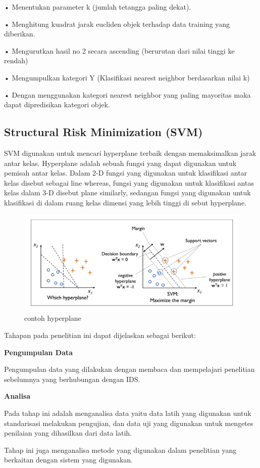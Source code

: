 \documentclass[conference]{IEEEtran}
\begin{document}
• Menentukan parameter k (jumlah tetangga paling dekat).

• Menghitung kuadrat jarak eucliden objek terhadap data
training yang diberikan.

• Mengurutkan hasil no 2 secara ascending (berurutan dari
nilai tinggi ke rendah)

• Mengumpulkan kategori Y (Klasifikasi nearest neighbor
berdasarkan nilai k)

• Dengan menggunakan kategori nearest neighbor yang
paling mayoritas maka dapat dipredisikan kategori objek.

\subsection{Structural Risk Minimization (SVM)}
SVM digunakan untuk mencari hyperplane terbaik dengan
memaksimalkan jarak antar kelas. Hyperplane adalah sebuah
fungsi yang dapat digunakan untuk pemisah antar kelas.
Dalam 2-D fungsi yang digunakan untuk klasifikasi antar
kelas disebut sebagai line whereas, fungsi yang digunakan
untuk klasifikasi antas kelas dalam 3-D disebut plane similarly,
sedangan fungsi yang digunakan untuk klasifikasi di dalam
ruang kelas dimensi yang lebih tinggi di sebut hyperplane.

\begin{figure}
\centering
\includegraphics[width=.4\textwidth]{Gambar/gambar8.png}
\caption{contoh hyperplane}
\end{figure}

Tahapan pada penelitian ini dapat dijelaskan sebagai berikut:

\noindent \textbf{Pengumpulan Data}

Pengumpulan data yang dilakukan dengan membaca dan mempelajari penelitian sebelumnya yang berhubungan dengan IDS.

\noindent \textbf{Analisa}

Pada tahap ini adalah menganalisa data yaitu data latih yang digunakan untuk standarisasi melakukan pengujian, dan data uji yang digunakan untuk mengetes penilaian yang dihasilkan
dari data latih.

Tahap ini juga menganalisa metode yang digunakan dalam penelitian yang berkaitan dengan sistem yang digunakan.
\end{document}
